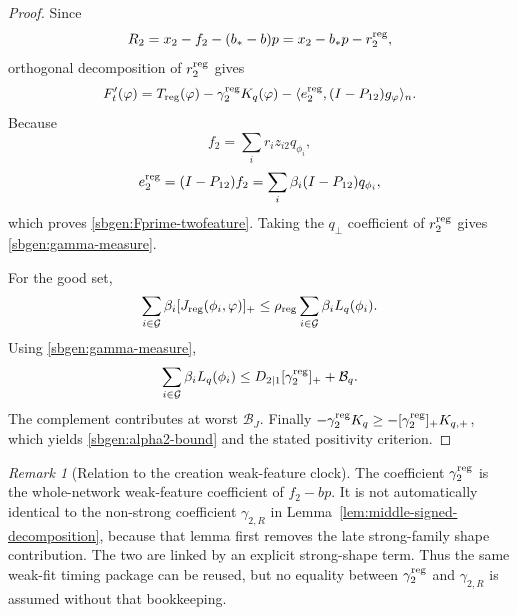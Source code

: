 \documentclass{article} %
\theoremstyle{plain}
\theoremstyle{definition}
\theoremstyle{remark}
\newtheorem{remark}[theorem]{Remark}
\begin{document}
\begin{proof}
Since
\[
R_2=x_2-f_2-(b_*-b)p
=x_2-b_*p-r_2^{\rm reg},
\]
orthogonal decomposition of $r_2^{\rm reg}$ gives
\[
F_t'(\varphi)
=
T_{\rm reg}(\varphi)
-
\gamma_2^{\rm reg}K_q(\varphi)
-
\langle e_2^{\rm reg},(I-P_{12})g_\varphi\rangle_n.
\]
Because
\[
f_2=\sum_i r_i z_{i2}q_{\phi_i},
\]
\[
e_2^{\rm reg}
=(I-P_{12})f_2
=
\sum_i\beta_i(I-P_{12})q_{\phi_i},
\]
which proves \eqref{sbgen:Fprime-twofeature}.  Taking the $q_\perp$
coefficient of $r_2^{\rm reg}$ gives \eqref{sbgen:gamma-measure}.

For the good set,
\[
\sum_{i\in\mathcal G}\beta_i
[J_{\rm reg}(\phi_i,\varphi)]_+
\le
\rho_{\rm reg}
\sum_{i\in\mathcal G}\beta_iL_q(\phi_i).
\]
Using \eqref{sbgen:gamma-measure},
\[
\sum_{i\in\mathcal G}\beta_iL_q(\phi_i)
\le
D_{2|1}[\gamma_2^{\rm reg}]_+ +\mathcal B_q.
\]
The complement contributes at worst $\mathcal B_J$.  Finally
$-\gamma_2^{\rm reg}K_q\ge-[\gamma_2^{\rm reg}]_+K_{q,+}$, which yields
\eqref{sbgen:alpha2-bound} and the stated positivity criterion.
\end{proof}

\begin{remark}[Relation to the creation weak-feature clock]
The coefficient $\gamma_2^{\rm reg}$ is the whole-network weak-feature
coefficient of $f_2-bp$.  It is not automatically identical to the
non-strong coefficient $\gamma_{2,R}$ in
Lemma~\ref{lem:middle-signed-decomposition}, because that lemma first removes
the late strong-family shape contribution.  The two are linked by an
explicit strong-shape term.  Thus the same weak-fit timing package can be
reused, but no equality between $\gamma_2^{\rm reg}$ and
$\gamma_{2,R}$ is assumed without that bookkeeping.
\end{remark}
\end{document}
